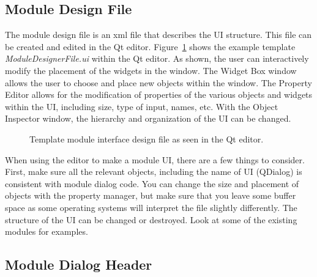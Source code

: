 \documentclass[fleqn,11pt,openany]{book}
\begin{document}
\subsection{Module Design File}

The module design file is an xml file that describes the UI structure.  
This file can be created and edited in the Qt editor.  
Figure~\ref{fig:qteditor} shows the example template \emph{ModuleDesignerFile.ui} within the Qt editor.
As shown, the user can interactively modify the placement of the widgets in the window.  
The Widget Box window allows the user to choose and place new objects within the window.  
The Property Editor allows for the modification of properties of the various objects and widgets within the UI, including size, type of input, names, etc.
With the Object Inspector window, the hierarchy and organization of the UI can be changed.

\begin{figure}[H]
\centerline{
}
\caption{Template module interface design file as seen in the Qt editor.}
\label{fig:qteditor}
\end{figure}

When using the editor to make a module UI, there are a few things to consider.
First, make sure all the relevant objects, including the name of UI (QDialog) is consistent with module dialog code.  
You can change the size and placement of objects with the property manager, but make sure that you leave some buffer space as some operating systems will interpret the file slightly differently.  
The structure of the UI can be changed or destroyed.
Look at some of the existing modules for examples.

\subsection{Module Dialog Header}
\end{document}

